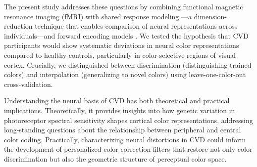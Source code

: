 The present study addresses these questions by combining functional magnetic resonance imaging (fMRI) with shared response modeling \cite{chen2015}---a dimension-reduction technique that enables comparison of neural representations across individuals---and forward encoding models \cite{brouwer2009}. We tested the hypothesis that CVD participants would show systematic deviations in neural color representations compared to healthy controls, particularly in color-selective regions of visual cortex. Crucially, we distinguished between discrimination (distinguishing trained colors) and interpolation (generalizing to novel colors) using leave-one-color-out cross-validation.

Understanding the neural basis of CVD has both theoretical and practical implications. Theoretically, it provides insights into how genetic variation in photoreceptor spectral sensitivity shapes cortical color representations, addressing long-standing questions about the relationship between peripheral and central color coding. Practically, characterizing neural distortions in CVD could inform the development of personalized color correction filters that restore not only color discrimination but also the geometric structure of perceptual color space.

